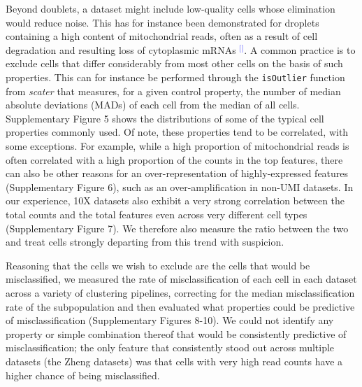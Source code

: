 \documentclass[11pt]{article}
\renewcommand{\cite}[1]{\textcolor{Blue}{$^[$\supercite{#1}$^]$}}
\begin{document}
Beyond doublets, a dataset might include low-quality cells whose elimination would reduce noise. This has for instance been demonstrated for droplets containing a high content of mitochondrial reads, often as a result of cell degradation and resulting loss of cytoplasmic mRNAs \cite{IlicicLowQual2016}. A common practice is to exclude cells that differ considerably from most other cells on the basis of such properties. This can for instance be performed through the \texttt{isOutlier} function from \textit{scater} that measures, for a given control property, the number of median absolute deviations (MADs) of each cell from the median of all cells. Supplementary Figure 5 shows the distributions of some of the typical cell properties commonly used. Of note, these properties tend to be correlated, with some exceptions. For example, while a high proportion of mitochondrial reads is often correlated with a high proportion of the counts in the top features, there can also be other reasons for an over-representation of highly-expressed features (Supplementary Figure 6), such as an over-amplification in non-UMI datasets. In our experience, 10X datasets also exhibit a very strong correlation between the total counts and the total features even across very different cell types (Supplementary Figure 7). We therefore also measure the ratio between the two and treat cells strongly departing from this trend with suspicion.

Reasoning that the cells we wish to exclude are the cells that would be misclassified, we measured the rate of misclassification of each cell in each dataset across a variety of clustering pipelines, correcting for the median misclassification rate of the subpopulation and then evaluated what properties could be predictive of misclassification (Supplementary Figures 8-10). We could not identify any property or simple combination thereof that would be consistently predictive of misclassification; the only feature that consistently stood out across multiple datasets (the Zheng datasets) was that cells with very high read counts have a higher chance of being misclassified.
\end{document}
